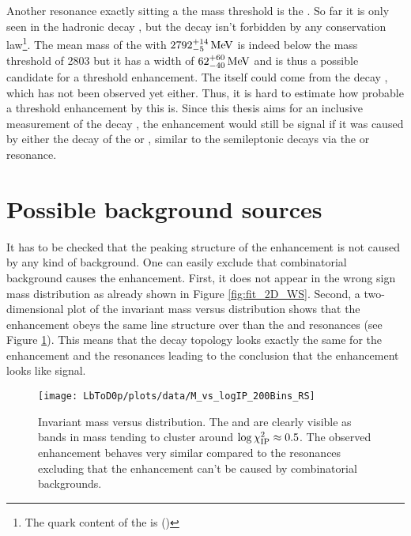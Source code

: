 Another resonance exactly sitting a the \Dz\proton mass threshold is the .
So far it is only seen in the hadronic decay , but the decay  isn't forbidden by any conservation law\footnote{The quark content of the  is (\uquark\dquark\cquark)}.
The mean mass of the  with $2792^{+14}_{-5}\mathrm{\,Me\kern -0.1em V}$ is indeed below the \Dz\proton mass threshold of 2803 \mev but it has a width of $62^{+60}_{-40}\mathrm{\,Me\kern -0.1em V}$ \cite{PDG} and is thus a possible candidate for a threshold enhancement.
The  itself could come from the decay , which has not been observed yet either.
Thus, it is hard to estimate how probable a threshold enhancement by this  is.
Since this thesis aims for an inclusive measurement of the decay \LbToDpmunuX, the enhancement would still be signal if it was caused by either the decay of the  or , similar to the semileptonic \Lb decays via the \LcResI or \LcResII resonance.

\section{Possible background sources}
It has to be checked that the peaking structure of the enhancement is not caused by any kind of background.
One can easily exclude that combinatorial background causes the enhancement.
First, it does not appear in the wrong sign \Dz\proton mass distribution as already shown in Figure \ref{fig:fit_2D_WS}.
Second, a two-dimensional plot of the invariant \Dz\proton mass versus \logIP distribution shows that the enhancement obeys the same line structure over \logIP than the \LcResI and \LcResII resonances (see Figure \ref{fig:plot_M_vs_logIP}).
This means that the decay topology looks exactly the same for the enhancement and the resonances leading to the conclusion that the enhancement looks like signal.
\begin{figure}[ptb]
	\centering
	\texttt{[image: LbToD0p/plots/data/M\_vs\_logIP\_200Bins\_RS]}
	\caption{Invariant \Dz\proton mass versus \logIP distribution. The \LcResI and \LcResII are clearly visible as bands in \Dz\proton mass tending to cluster around $\log \chi^2_{\text{IP}} \approx 0.5$. The observed enhancement behaves very similar compared to the resonances excluding that the enhancement can't be caused by combinatorial backgrounds.}
	\label{fig:plot_M_vs_logIP}
\end{figure}

